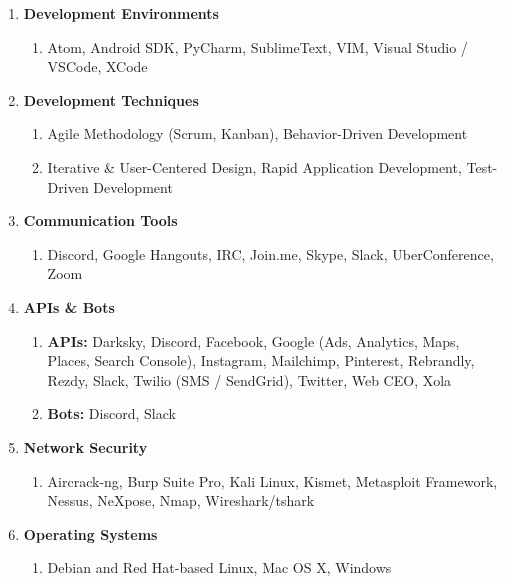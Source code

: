 \documentclass[oneside]{article}%
\begin{document}
\begin{enumerate}[]
	\item \textbf{Development Environments}
		\begin{enumerate}[-]
			\item Atom, Android SDK, PyCharm, SublimeText, VIM, Visual Studio / VSCode, XCode
		\end{enumerate}
	
	\item \textbf{Development Techniques}
		\begin{enumerate}[-]
			\item Agile Methodology (Scrum, Kanban), Behavior-Driven Development
			\item Iterative \& User-Centered Design, Rapid Application Development, Test-Driven Development
		\end{enumerate}
	
	\item \textbf{Communication Tools}
		\begin{enumerate}[-]
			\item Discord, Google Hangouts, IRC, Join.me, Skype, Slack, UberConference, Zoom
		\end{enumerate}
	
	\item \textbf{APIs \& Bots}
		\begin{enumerate}[-]
			\item \textbf{APIs:} Darksky, Discord, Facebook, Google (Ads, Analytics, Maps, Places, Search Console), Instagram, Mailchimp, Pinterest, Rebrandly, Rezdy, Slack, Twilio (SMS / SendGrid), Twitter, Web CEO, Xola
			\item \textbf{Bots:} Discord, Slack
		\end{enumerate}
	
	\item \textbf{Network Security}
		\begin{enumerate}[-]
			\item Aircrack-ng, Burp Suite Pro, Kali Linux, Kismet, Metasploit Framework, Nessus, NeXpose, Nmap, Wireshark/tshark
		\end{enumerate}
	
	\item \textbf{Operating Systems}
		\begin{enumerate}[-]
			\item Debian and Red Hat-based Linux, Mac OS X, Windows
		\end{enumerate}
\end{enumerate}
\end{document}
